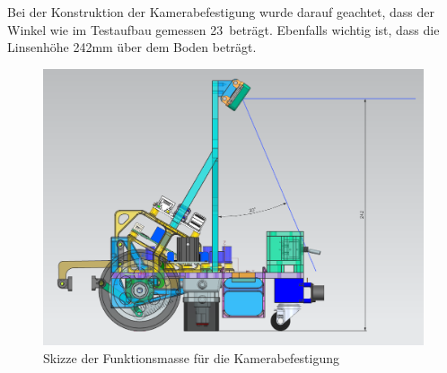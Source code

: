 Bei der Konstruktion der Kamerabefestigung wurde darauf geachtet, dass der Winkel wie im Testaufbau gemessen 23\textdegree\ beträgt. Ebenfalls wichtig ist, dass die Linsenhöhe 242mm über dem Boden beträgt. 


\begin{figure}[H]
\centering
\begin{minipage}[b]{0.58\textwidth}
\centering
\includegraphics[width= \textwidth ]{assets/MT/Sichtfeld_Roboter.png}
\caption{Skizze der Funktionsmasse für die Kamerabefestigung}
\label{fig:Skizze der Funktionsmasse für die Kamerabefestigung}


\end{minipage}
\end{figure}
